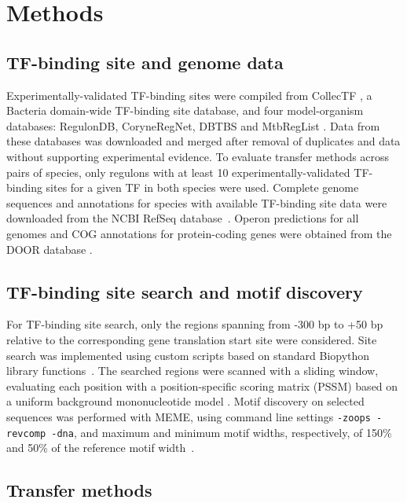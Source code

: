\section{Methods}

\subsection{TF-binding site and genome data}

Experimentally-validated TF-binding sites were compiled from CollecTF
\cite{kilic2013collectf}, a Bacteria domain-wide TF-binding site database, and
four model-organism databases: RegulonDB, CoryneRegNet, DBTBS and MtbRegList
\cite{jacques2005mtbreglist, sierro2008dbtbs, pauling2012coryneregnet,
  salgado2013regulondb}. Data from these databases was downloaded and merged
after removal of duplicates and data without supporting experimental
evidence. To evaluate transfer methods across pairs of species, only regulons
with at least 10 experimentally-validated TF-binding sites for a given TF in
both species were used. Complete genome sequences and annotations for species
with available TF-binding site data were downloaded from the NCBI RefSeq
database~\cite{pruitt2007ncbi}. Operon predictions for all genomes and COG
annotations for protein-coding genes were obtained from the DOOR database
\cite{tatusov2000cog, mao2009door}.

\subsection{TF-binding site search and motif discovery}

For TF-binding site search, only the regions spanning from -300 bp to +50 bp
relative to the corresponding gene translation start site were considered. Site
search was implemented using custom scripts based on standard Biopython library
functions~\cite{cock2009biopython}. The searched regions were scanned with a
sliding window, evaluating each position with a position-specific scoring
matrix (PSSM) based on a uniform background mononucleotide model
\cite{stormo2000dna}. Motif discovery on selected sequences was performed with
MEME, using command line settings \texttt{-zoops -revcomp -dna}, and maximum
and minimum motif widths, respectively, of 150\% and 50\% of the reference
motif width~\cite{bailey2015meme}.

\subsection{Transfer methods}

